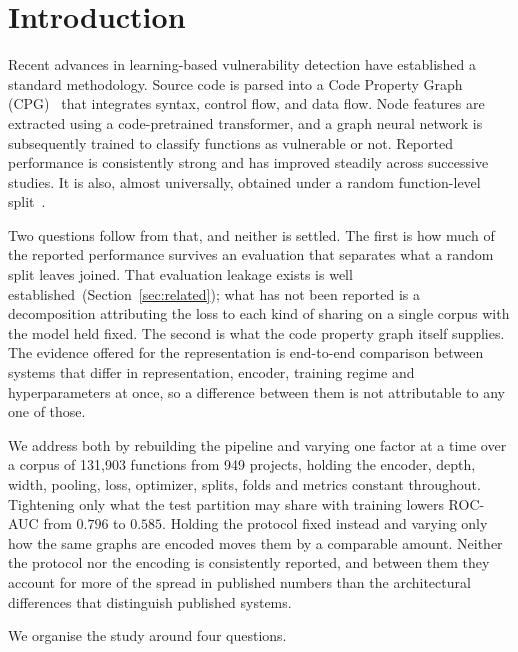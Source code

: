 \section{Introduction}

Recent advances in learning-based vulnerability detection have established a
standard methodology. Source code is parsed into a Code Property Graph
(CPG)~\citep{6956589} that integrates syntax, control flow, and data flow. Node
features are extracted using a code-pretrained transformer, and a graph neural
network is subsequently trained to classify functions as vulnerable or not.
Reported performance is consistently strong and has improved steadily across
successive studies. It is also, almost universally, obtained under a random
function-level
split~\citep{chakraborty2020deeplearningbasedvulnerability,ding2024primevul}.

Two questions follow from that, and neither is settled. The first is how much of
the reported performance survives an evaluation that separates what a random
split leaves joined. That evaluation leakage exists is well
established~(Section~\ref{sec:related}); what has not been reported is a
decomposition attributing the loss to each kind of sharing on a single corpus
with the model held fixed. The second is what the code property graph itself
supplies. The evidence offered for the representation is end-to-end comparison
between systems that differ in representation, encoder, training regime and
hyperparameters at once, so a difference between them is not attributable to any
one of those.

We address both by rebuilding the pipeline and varying one factor at a time over
a corpus of 131,903 functions from 949 projects, holding the encoder, depth,
width, pooling, loss, optimizer, splits, folds and metrics constant throughout.
Tightening only what the test partition may share with training lowers ROC-AUC
from $0.796$ to $0.585$. Holding the protocol fixed instead and varying only how
the same graphs are encoded moves them by a comparable amount. Neither the
protocol nor the encoding is consistently reported, and between them they account
for more of the spread in published numbers than the architectural differences
that distinguish published systems.

We organise the study around four questions.

